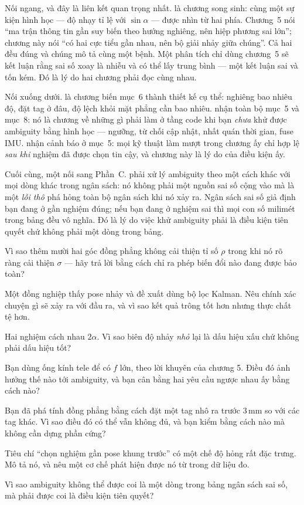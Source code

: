 \documentclass[../../marker.tex]{subfiles}
\begin{document}
Nối ngang, và đây là liên kết quan trọng nhất.  là chương song sinh: cùng một sự kiện hình học --- độ nhạy tỉ lệ với \(\sin\alpha\) --- được nhìn từ hai phía. Chương~5 nói ``ma trận thông tin gần suy biến theo hướng nghiêng, nên hiệp phương sai lớn''; chương này nói ``có hai cực tiểu gần nhau, nên bộ giải nhảy giữa chúng''. Cả hai đều đúng và chúng mô tả cùng một bệnh. Một phân tích chỉ dùng chương~5 sẽ kết luận rằng sai số xoay là nhiễu và có thể lấy trung bình --- một kết luận sai và tốn kém. Đó là lý do hai chương phải đọc cùng nhau.

Nối xuống dưới.  là chương biến mục~6 thành thiết kế cụ thể: nghiêng bao nhiêu độ, đặt tag ở đâu, độ lệch khỏi mặt phẳng cần bao nhiêu.  nhận toàn bộ mục~5 và mục~8: nó là chương về những gì phải làm ở tầng code khi bạn \emph{chưa} khử được ambiguity bằng hình học --- ngưỡng, từ chối cập nhật, nhất quán thời gian, fuse IMU.  nhận cảnh báo ở mục~5: mọi kỹ thuật làm mượt trong chương ấy chỉ hợp lệ \emph{sau khi} nghiệm đã được chọn tin cậy, và chương này là lý do của điều kiện ấy.

Cuối cùng, một nối sang Phần~C.  phải xử lý ambiguity theo một cách khác với mọi dòng khác trong ngân sách: nó không phải một nguồn sai số cộng vào mà là một \emph{lỗi thô} phá hỏng toàn bộ ngân sách khi nó xảy ra. Ngân sách sai số giả định bạn đang ở gần nghiệm đúng; nếu bạn đang ở nghiệm sai thì mọi con số milimét trong bảng đều vô nghĩa. Đó là lý do việc khử ambiguity phải là điều kiện tiên quyết chứ không phải một dòng trong bảng.

\begin{tukiem}
\item Vì sao thêm mười hai góc đồng phẳng không cải thiện tỉ số \(\rho\) trong khi nó rõ ràng cải thiện \(\sigma\) --- hãy trả lời bằng cách chỉ ra phép biến đổi nào đang được bảo toàn?
\item Một đồng nghiệp thấy pose nhảy và đề xuất dùng bộ lọc Kalman. Nêu chính xác chuyện gì sẽ xảy ra với đầu ra, và vì sao kết quả trông tốt hơn nhưng thực chất tệ hơn.
\item Hai nghiệm cách nhau \(2\alpha\). Vì sao biên độ nhảy \emph{nhỏ} lại là dấu hiệu xấu chứ không phải dấu hiệu tốt?
\item Bạn dùng ống kính tele để có \(f\) lớn, theo lời khuyên của chương 5. Điều đó ảnh hưởng thế nào tới ambiguity, và bạn cân bằng hai yêu cầu ngược nhau ấy bằng cách nào?
\item Bạn đã phá tính đồng phẳng bằng cách đặt một tag nhô ra trước 3\,mm so với các tag khác. Vì sao điều đó có thể vẫn không đủ, và bạn kiểm bằng cách nào mà không cần dựng phần cứng?
\item Tiêu chí ``chọn nghiệm gần pose khung trước'' có một chế độ hỏng rất đặc trưng. Mô tả nó, và nêu một cơ chế phát hiện được nó từ trong dữ liệu đo.
\item Vì sao ambiguity không thể được coi là một dòng trong bảng ngân sách sai số, mà phải được coi là điều kiện tiên quyết?
\end{tukiem}
\ifSubfilesClassLoaded{\printbibliography[title={Nguồn}]}{}
\end{document}

